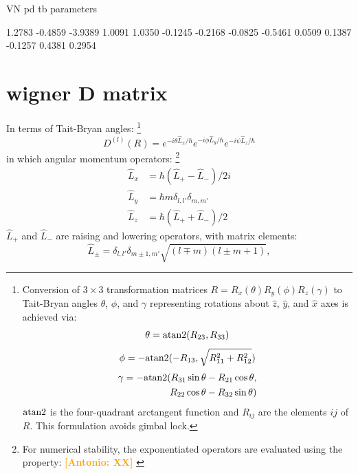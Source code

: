 \documentclass[twocolumn,showpacs,preprintnumbers,superscriptaddress,prb,floatfix,aps,10pt]{revtex4-1}
\newcommand{\abmei}[1]{\textcolor{orange}{ \bf [Antonio: #1] }}
\newcommand*{\wignerDl}{D^{(l)}(R)}
\newcommand*{\x}{\times}
\begin{document}


\clearpage

VN pd tb parameters

    1.2783
   -0.4859
   -3.9389
    1.0091
    1.0350
   -0.1245
   -0.2168
   -0.0825
   -0.5461
    0.0509
    0.1387
   -0.1257
    0.4381
    0.2954




\appendix

%
%
\section{wigner D matrix} 
\label{appendix:wigner}

In terms of Tait-Bryan angles:
%
\footnote{
Conversion of $3\x3$ transformation matrices $R = R_x(\theta)R_y(\phi)R_z(\gamma)$ to Tait-Bryan angles $\theta$, $\phi$, and $\gamma$ representing rotations about $\hat{z}$, $\hat{y}$, and $\hat{x}$ axes is achieved via:
\begin{equation}
\theta = {\rm atan2}(R_{23},R_{33})
\end{equation}
\begin{equation}
\phi   =-{\rm atan2}(-R_{13},\sqrt{R_{11}^2+R_{12}^2})
\end{equation}
\begin{equation}
\begin{split}
\gamma =-{\rm atan2}(R_{31}\sin{\theta}-R_{21}\cos{\theta}, \\ 
       \quad         R_{22}\cos{\theta}-R_{32}\sin{\theta})
\end{split}
\end{equation}
${\rm atan2}$ is the four-quadrant arctangent function and $R_{ij}$ are the elements $ij$ of $R$. This formulation avoids gimbal lock.} 
%
\begin{equation}
\wignerDl = e^{-i\theta\hat{L}_x/\hbar} e^{-i\phi\hat{L}_y/\hbar} e^{-i\psi\hat{L}_z/\hbar}
\end{equation}
%
in which angular momentum operators:
%
\footnote{For numerical stability, the exponentiated operators are evaluated using the property: \abmei{XX} } \cite{shankar_fundamentals_2014}
%
\begin{align}
\label{eq:angular_momenta}
\hat{L}_x & = \hbar (\hat{L}_{+}-\hat{L}_{-})/2i \\
\hat{L}_y & = \hbar m \delta_{l,l'}\delta_{m,m'} \\
\hat{L}_z & = \hbar (\hat{L}_{+}+\hat{L}_{-})/2
\end{align}
$\hat{L}_+$ and $\hat{L}_-$ are raising and lowering operators, with matrix elements:
\begin{equation}
\label{eq:raising_lowering_operator}
\hat{L}_{\pm} = \delta_{l,l'}\delta_{m\pm1,m'} \sqrt{(l\mp m)(l\pm m+1)},
\end{equation}
\end{document}
